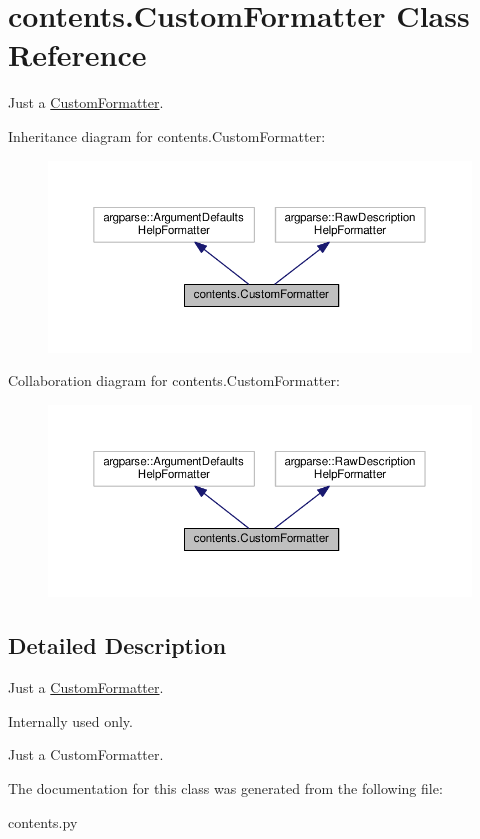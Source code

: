 \hypertarget{classcontents_1_1CustomFormatter}{\section{contents.\+Custom\+Formatter Class Reference}
\label{classcontents_1_1CustomFormatter}
}


Just a \hyperlink{classcontents_1_1CustomFormatter}{Custom\+Formatter}.  




Inheritance diagram for contents.\+Custom\+Formatter\+:
\nopagebreak
\begin{figure}[H]
\begin{center}
\leavevmode
\includegraphics[width=350pt]{classcontents_1_1CustomFormatter__inherit__graph}
\end{center}
\end{figure}


Collaboration diagram for contents.\+Custom\+Formatter\+:
\nopagebreak
\begin{figure}[H]
\begin{center}
\leavevmode
\includegraphics[width=350pt]{classcontents_1_1CustomFormatter__coll__graph}
\end{center}
\end{figure}


\subsection{Detailed Description}
Just a \hyperlink{classcontents_1_1CustomFormatter}{Custom\+Formatter}. 

Internally used only. \begin{DoxyVerb}Just a CustomFormatter.
\end{DoxyVerb}
 

The documentation for this class was generated from the following file\+:\begin{DoxyCompactItemize}
\item 
contents.\+py\end{DoxyCompactItemize}
